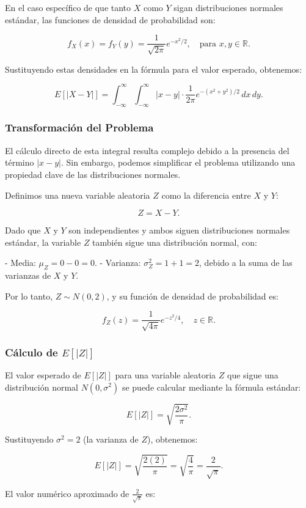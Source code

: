 \documentclass[12pt]{article}
\begin{document}
En el caso específico de que tanto $X$ como $Y$ sigan distribuciones normales estándar, las funciones de densidad de probabilidad son:

\[
f_X(x) = f_Y(y) = \frac{1}{\sqrt{2\pi}} e^{-x^2/2}, \quad \text{para } x, y \in \mathbb{R}.
\]

Sustituyendo estas densidades en la fórmula para el valor esperado, obtenemos:

\[
E[|X - Y|] = \int_{-\infty}^\infty \int_{-\infty}^\infty |x - y| \cdot \frac{1}{2\pi} e^{-(x^2 + y^2)/2} \, dx \, dy.
\]

\subsubsection{Transformación del Problema}
El cálculo directo de esta integral resulta complejo debido a la presencia del término $|x - y|$. Sin embargo, podemos simplificar el problema utilizando una propiedad clave de las distribuciones normales.

Definimos una nueva variable aleatoria $Z$ como la diferencia entre $X$ y $Y$:

\[
Z = X - Y.
\]

Dado que $X$ y $Y$ son independientes y ambos siguen distribuciones normales estándar, la variable $Z$ también sigue una distribución normal, con:

- Media: $\mu_Z = 0 - 0 = 0$.
- Varianza: $\sigma_Z^2 = 1 + 1 = 2$, debido a la suma de las varianzas de $X$ y $Y$.

Por lo tanto, $Z \sim N(0, 2)$, y su función de densidad de probabilidad es:

\[
f_Z(z) = \frac{1}{\sqrt{4\pi}} e^{-z^2/4}, \quad z \in \mathbb{R}.
\]

\subsubsection{Cálculo de $E[|Z|]$}
El valor esperado de $E[|Z|]$ para una variable aleatoria $Z$ que sigue una distribución normal $N(0, \sigma^2)$ se puede calcular mediante la fórmula estándar:

\[
E[|Z|] = \sqrt{\frac{2\sigma^2}{\pi}}.
\]

Sustituyendo $\sigma^2 = 2$ (la varianza de $Z$), obtenemos:

\[
E[|Z|] = \sqrt{\frac{2(2)}{\pi}} = \sqrt{\frac{4}{\pi}} = \frac{2}{\sqrt{\pi}}.
\]

El valor numérico aproximado de $\frac{2}{\sqrt{\pi}}$ es:
\end{document}
